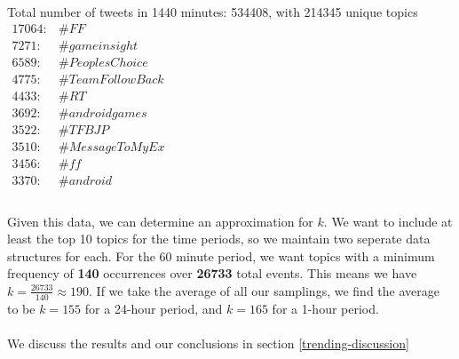 Total number of tweets in 1440 minutes: 534408, with 214345 unique topics\\

$\begin{array}{ll}
    17064: & \#FF \\
    7271: & \#gameinsight \\
    6589: & \#PeoplesChoice \\
    4775: & \#TeamFollowBack \\
    4433: & \#RT \\
    3692: & \#androidgames \\
    3522: & \#TFBJP \\
    3510: & \#MessageToMyEx \\
    3456: & \#ff \\
    3370: & \#android \\
\end{array}$
\\
\\
Given this data, we can determine an approximation for $k$. We want to include at least the top 10 topics for the time periods, so we maintain two seperate data structures for each. For the 60 minute period, we want topics with a minimum frequency of \textbf{140} occurrences over \textbf{26733} total events. This means we have $k = \frac{26733}{140} \approx 190$. If we take the average of all our samplings, we find the average to be $k = 155$ for a 24-hour period, and $k = 165$ for a 1-hour period.
\\
\\
We discuss the results and our conclusions in section \ref{trending-discussion}
